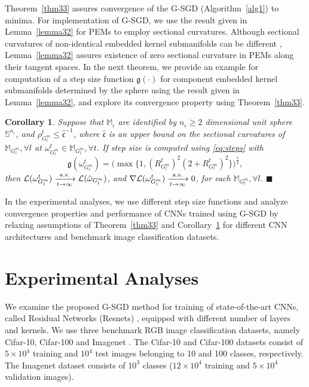 \documentclass[10pt,journal,compsoc]{IEEEtran}
\newtheorem{corr}[theorem]{Corollary}
\theoremstyle{definition}
\theoremstyle{definition}
\theoremstyle{remark}
\theoremstyle{remark}
\theoremstyle{remark}
\newcommand*{\QEDbs}{\hfill\ensuremath{\blacksquare}}%
\begin{document}
Theorem~\ref{thm33} assures convergence of the G-SGD (Algorithm~\ref{alg1}) to minima. For  implementation of G-SGD, we use the result given in Lemma~\ref{lemma32} for PEMs to employ sectional curvatures. Although sectional curvatures of non-identical embedded kernel submanifolds can be different \cite{oo16}, Lemma~\ref{lemma32} assures existence of zero sectional curvature in PEMs along their tangent spaces. In the next theorem, we provide an example for computation of a step size function $\mathfrak{g}(\cdot)$ for component embedded kernel submanifolds determined by the sphere using the result given in Lemma~\ref{lemma32}, and explore its convergence property using Theorem~\ref{thm33}.   


\begin{corr}
	\label{corr34}
Suppose that $\mathbb{M}_{\iota}$ are identified by ${n_{\iota} \geq 2}$ dimensional unit sphere $\mathbb{S}^{n_{\iota}}$, and $\rho_{G^m_l}^t \leq \hat{\mathfrak{c}}^{-1}$, where $\hat{\mathfrak{c}}$ is an upper bound on the sectional curvatures of $\mathbb{M}_{G^m_l}, \forall l$ at $\omega_{G^m_l}^t \in \mathbb{M}_{G^m_l}, \forall t$. If step size is computed using \eqref{eq:steps} with 
\begin{equation}{\mathfrak{g}(\omega_{G^m_l}^t) = (\max\{ 1, (R_{G^m_l}^{t})^2(2+R_{G^m_l}^{t})^2 \} })^{\frac{1}{2}},
\end{equation}
 then ${\mathcal{L}(\omega^t_{G^m_l}) \xrightarrow[t \to \infty]{\rm a.s.} \mathcal{L}(\hat{\omega}_{G^m_l})}$, and ${\nabla \mathcal{L}(\omega^t_{G^m_l}) \xrightarrow[t \to \infty]{\rm a.s.} 0}$, for each $\mathbb{M}_{G^m_l}, \forall l$. \QEDbs	
\end{corr}

In the experimental analyses, we use different step size functions and analyze convergence properties and performance of CNNs trained using G-SGD by relaxing assumptions of  Theorem~\ref{thm33} and Corollary~\ref{corr34} for different CNN architectures and benchmark image classification datasets.





\section{Experimental Analyses}
\label{sec:exp}
 
We examine the proposed G-SGD method for training of state-of-the-art CNNs, called Residual Networks (Resnets) \cite{res_net}, equipped with different number of layers and kernels. We use three benchmark RGB image classification datasets, namely Cifar-10, Cifar-100 and Imagenet \cite{Alexnet}. The Cifar-10 and Cifar-100 datasets consist of $5\times 10^4$  training and $10^4$ test images belonging to 10 and 100 classes, respectively. The Imagenet dataset consists   of   $10^3$ classes  ($12 \times 10^4$ training and $5\times 10^4$ validation images). 
\end{document}
